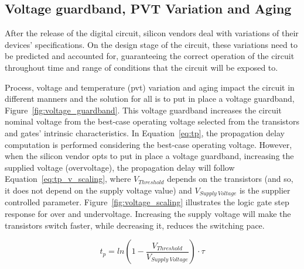 \subsection{Voltage guardband, PVT Variation and Aging}

After the release of the digital circuit, silicon vendors deal with variations of their devices' specifications. On the design stage of the circuit, these variations need to be predicted and accounted for, guaranteeing the correct operation of the circuit throughout time and range of conditions that the circuit will be exposed to.

Process, voltage and temperature (\acrshort{pvt}) variation and aging impact the circuit in different manners and the solution for all is to put in place a voltage guardband, Figure~\ref{fig:voltage_guardband}. This voltage guardband increases the circuit nominal voltage from the best-case operating voltage selected from the transistors and gates' intrinsic characteristics.
In Equation~\ref{eq:tp}, the propagation delay computation is performed considering the best-case operating voltage. However, when the silicon vendor opts to put in place a voltage guardband, increasing the supplied voltage (overvoltage), the propagation delay will follow Equation~\ref{eq:tp_v_scaling}, where $V_{Threshold}$ depends on the transistors (and so, it does not depend on the supply voltage value) and $V_{Supply \: Voltage}$ is the supplier controlled parameter. Figure~\ref{fig:voltage_scaling} illustrates the logic gate step response for over and undervoltage. Increasing the supply voltage will make the transistors switch faster, while decreasing it, reduces the switching pace.



\begin{equation}
    t_p=ln(1-\frac{V_{Threshold}}{V_{Supply \: Voltage}})\cdot\tau
    \label{eq:tp_v_scaling}
\end{equation}

